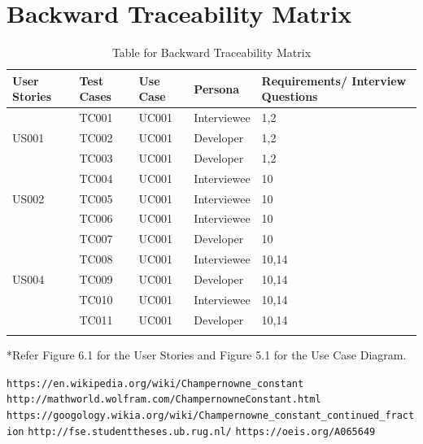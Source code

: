 \documentclass[12pt, a4paper]{report}
\begin{document}
\section{Backward Traceability Matrix}

\begin{longtable}{|p{3cm}|p{2cm}|p{2cm}|p{2cm}|p{4cm}|}

    \hline
    \textbf{User Stories} & \textbf{Test Cases} & \textbf{Use Case} & \textbf{Persona} & \textbf{Requirements/ Interview Questions} \\\hline
   \multirow{3}{0pt}{US001} & TC001 & UC001 & Interviewee & 1,2 \\\cline{2-5}
   & TC002 & UC001 & Developer & 1,2 \\\cline{2-5}
   & TC003 & UC001  & Developer & 1,2 \\\hline
   \multirow{3}{}{US002} & TC004 & UC001 & Interviewee & 10 \\\cline{2-5}
   & TC005 & UC001 & Interviewee & 10 \\\hline
   \multirow{3}{}{US003} & TC006 & UC001  & Interviewee & 10 \\\cline{2-5}
   & TC007 & UC001 & Developer & 10 \\\hline
   \multirow{3}{}{US004} & TC008 & UC001  & Interviewee & 10,14 \\\cline{2-5}
   & TC009 & UC001 & Developer & 10,14 \\\hline
    \multirow{3}{}{US005} & TC010 & UC001 & Interviewee & 10,14 \\\cline{2-5}
    & TC011 & UC001 & Developer & 10,14 \\\hline
\caption{Table for Backward Traceability Matrix}
\label{table:1}
\end{longtable}
{*Refer Figure 6.1 for the User Stories and Figure 5.1 for the Use Case Diagram.}

\begin{thebibliography}{9}
    \texttt{https://en.wikipedia.org/wiki/Champernowne{\_}constant}
    \texttt{http://mathworld.wolfram.com/ChampernowneConstant.html}
    \texttt{https://googology.wikia.org/wiki/Champernowne{\_}constant{\_}continued{\_}fraction}
    \texttt{http://fse.studenttheses.ub.rug.nl/}
    \texttt{https://oeis.org/A065649}
\end{thebibliography}
\end{document}
